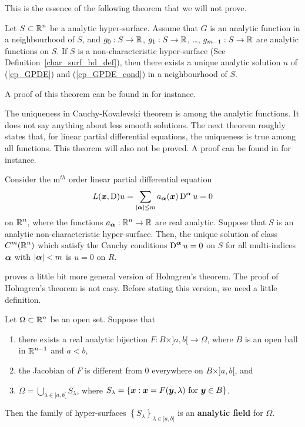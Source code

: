 This is the essence of the following theorem that we will not prove.

\begin{theorem} \label{cauchyKovalTh}
Let $\displaystyle S \subset \mathbb{R}^n$ be a analytic hyper-surface.  Assume that
$G$ is an analytic function in a neighbourhood of $S$, and
$g_0:S\rightarrow \mathbb{R}$, $g_1:S\rightarrow \mathbb{R}$, \ldots, 
$g_{m-1}:S\rightarrow \mathbb{R}$ are analytic functions on $S$.
If $S$ is a non-characteristic hyper-surface
(See Definition~\ref{char_surf_hd_def}),
then there exists a unique analytic solution $u$ of (\ref{cp_GPDE}) and
(\ref{cp_GPDE_cond}) in a neighbourhood of $S$.
\end{theorem}

A proof of this theorem can be found in \cite{J,Tr} for instance.

The uniqueness in Cauchy-Kovalevski theorem is among the analytic
functions.  It does not say anything about less smooth solutions.
The next theorem roughly states that, for linear partial differential
equations, the uniqueness is true among all functions.  This theorem
will also not be proved.  A proof can be found in \cite{Smo} for
instance.

\begin{theorem}[Holmgren] \label{HolmgrenTheo}
Consider the m$^{th}$ order linear partial differential equation
\[
L({\bm{x}}, \operatorname{D})u = \sum_{|{\bm{\alpha}}|\leq m}
a_{{\bm{\alpha}}}({\bm{x}}) \operatorname{D}^{{\bm{\alpha}}} u = 0
\]
on $\displaystyle \mathbb{R}^n$, where the functions
$\displaystyle a_{{\bm{\alpha}}}:\mathbb{R}^n \rightarrow \mathbb{R}$
are real analytic. Suppose that $S$ is an analytic non-characteristic
hyper-surface.  Then, the unique solution of class $\displaystyle C^m(\mathbb{R}^n)$
which satisfy the Cauchy conditions
$\displaystyle \operatorname{D}^{{\bm{\alpha}}} u = 0$
on $S$ for all multi-indices ${\bm{\alpha}}$ with
$|{\bm{\alpha}}|<m$ is $u=0$ on $R$.
\end{theorem}

\cite{J} proves a little bit more general version of Holmgren's theorem.
The proof of Holmgren's theorem is not easy.
Before stating this version, we need a little definition.

\begin{defn}
Let $\displaystyle \Omega \subset \mathbb{R}^n$ be an open set.  Suppose that
\begin{enumerate}
\item there exists a real analytic bijection
$F:B \times ]a,b[ \rightarrow \Omega$, where $B$ is an open ball in
$\displaystyle \mathbb{R}^{n-1}$ and $a<b$,
\item the Jacobian of $F$ is different from $0$ everywhere on
$B\times ]a,b[$, and
\item $\displaystyle \Omega = \bigcup_{\lambda \in ]a,b[} S_\lambda$, 
where $\displaystyle S_\lambda = \left\{ {\bm{x}} : {\bm{x}} = F({\bm{y}},\lambda)
\ \text{for} \ {\bm{y}} \in B \right\}$.
\end{enumerate}
Then the family of hyper-surfaces
$\displaystyle \left\{ S_\lambda \right\}_{\lambda \in ]a,b[}$ is an
{\bfseries analytic field} for $\Omega$.
\end{defn}

